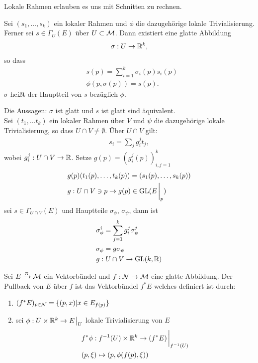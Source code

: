 Lokale Rahmen erlauben es uns mit Schnitten zu rechnen.

\begin{defs}[Hauptteil]
Sei $(s_1, \dots, s_k)$ ein lokaler Rahmen und $\phi$ die dazugehörige lokale Trivialisierung.
Ferner sei $s \in \Gamma_U (E)$ über $U \subset \mathcal{M}$.
Dann existiert eine glatte Abbildung
\begin{align}
\sigma : U \to \mathbb{R}^k,
\end{align}
so dass
\begin{align}
&s(p) = \sum^{k}_{i=1} \sigma_i (p) s_i(p)\\
&\phi(p, \sigma(p)) = s(p).
\end{align}
$\sigma$ heißt der Hauptteil von $s$ bezüglich $\phi$.
\end{defs}

\begin{bem}
Die Aussagen: $\sigma$ ist glatt und $s$ ist glatt sind äquivalent.\\
Sei $(t_1, \dots t_k)$ ein lokaler Rahmen über $V$ und $\psi$ die dazugehörige lokale Trivialisierung, so dass $U \cap V \neq \emptyset$.
Über $U \cap V$ gilt:
\begin{align}
s_i = \sum_j g^j_i t_j,
\end{align}
wobei $g^j_i : U \cap V \to \mathbb{R}$.
Setze $g(p) = (g^j_i (p))^k_{i,j =1}$
\begin{align}
&g(p)(t_1(p), \dots , t_k(p)) = (s_1(p), \dots, s_k(p))\\
&g: U \cap V \ni p \to g(p) \in \mathrm{GL}(E\eval_p)
\end{align}
sei $s \in \Gamma_{U \cap V} (E)$ und Hauptteile $\sigma_\phi$, $\sigma_\psi$, dann ist
\begin{align}
&\sigma^i_\phi = \sum^k_{j=1} g^j_i \sigma^j_{\psi}\\
&\sigma_\phi = g \sigma_\psi\\
&g : U \cap V \to \mathrm{GL} (k, \mathbb{R})
\end{align}
\end{bem}


\begin{defs}[Pullback]
Sei $E	\xrightarrow{\uppi} \mathcal{M}$ ein Vektorbündel und $f : \mathcal{N} \to \mathcal{M}$ eine glatte Abbildung.
Der Pullback von $E$ über $f$ ist das Vektorbündel $f^* E$ welches definiert ist durch:
\begin{enumerate}
\item $(f^* E)_{p \in \mathcal{N}} = \{ (p, x) \vert x \in E_{f(p)}\}$
\item sei $\phi : U \times \R^k \to E\eval_U$ lokale Trivialisierung von $E$
\begin{align}
&f^* \phi : f^{-1} (U) \times \R^k \to (f^* E)\eval_{f^{-1}(U)}\\
&(p, \xi) \mapsto (p, \phi(f(p), \xi)) 
\end{align}
\end{enumerate}
\end{defs}


